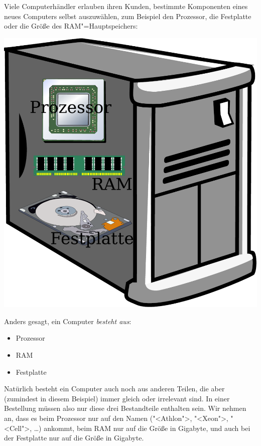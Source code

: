 %
Viele Computerhändler erlauben ihren Kunden, bestimmte Komponenten
eines neues Computers selbst auszuwählen, zum Beispiel den Prozessor,
die Festplatte oder die Größe des RAM"=Hauptspeichers:
%
\begin{center}
  \medskip
  \includegraphics[height=0.3\textheight]{zusammengesetzte-daten/computer}
  \medskip
\end{center}
%
Anders gesagt, ein Computer \emph{besteht aus}:
%
\begin{itemize}
\item Prozessor
\item RAM
\item Festplatte
\end{itemize}
%
Natürlich besteht ein Computer auch noch aus anderen Teilen, die
aber (zumindest in diesem Beispiel) immer gleich oder irrelevant sind.
In einer Bestellung müssen also nur diese drei Bestandteile
enthalten sein.  Wir nehmen an, dass es beim Prozessor nur auf den Namen
("<Athlon">, "<Xeon">, "<Cell">, \ldots) ankommt, beim RAM nur auf die
Größe in Gigabyte, und auch bei der Festplatte nur auf die Größe in
Gigabyte.

